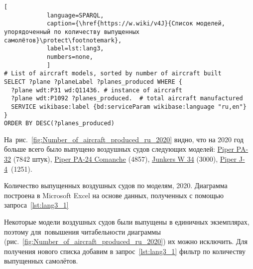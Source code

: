 \begin{lstlisting}[ 
            language=SPARQL, 
            caption={\href{https://w.wiki/v4J}{Список моделей, упорядоченный по количеству выпущенных самолётов}\protect\footnotemark}, 
            label=lst:lang3, 
            numbers=none,
            ]
# List of aircraft models, sorted by number of aircraft built
SELECT ?plane ?planeLabel ?planes_produced WHERE {
  ?plane wdt:P31 wd:Q11436. # instance of aircraft
  ?plane wdt:P1092 ?planes_produced.  # total aircraft manufactured
  SERVICE wikibase:label {bd:serviceParam wikibase:language "ru,en"}
}
ORDER BY DESC(?planes_produced)
\end{lstlisting}



На~рис.~\ref{fig:Number_of_aircraft_produced_ru_2020} видно, 
что на 2020 год больше всего было выпущено воздушных судов следующих моделей: 
\href{https://www.wikidata.org/wiki/Q2096452}{Piper PA-32} (\num{7842} штук), 
\href{https://www.wikidata.org/wiki/Q1860367}{Piper PA-24 Comanche} (\num{4857}), 
\href{https://www.wikidata.org/wiki/Q694521}{Junkers W 34} (\num{3000}), 
\href{https://www.wikidata.org/wiki/Q4046989}{Piper J-4}~(\num{1251}).


\begin{marginfigure}
    \setlength{\fboxsep}{0pt}%
    \setlength{\fboxrule}{1pt}%
	\caption[Количество выпущенных воздушных судов по моделям, 2020 год.]{Количество выпущенных воздушных судов по моделям, 2020. Диаграмма построена в Microsoft Excel на основе данных, полученных с помощью запроса~\protect\ref{lst:lang3_1}}%
    \label{fig:Number_of_aircraft_produced_ru_2020}%
\end{marginfigure}

Некоторые модели воздушных судов были выпущены в единичных экземплярах, 
поэтому для~повышения читабельности диаграммы 
(рис.~\ref{fig:Number_of_aircraft_produced_ru_2020}) их можно исключить. 
Для получения нового списка добавим в запрос~\ref{lst:lang3_1} фильтр по количеству выпущенных самолётов.


